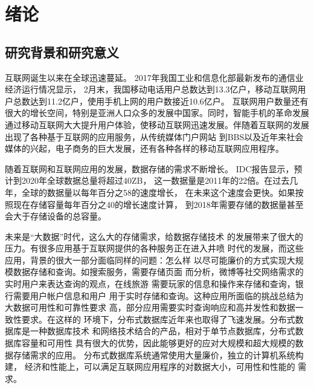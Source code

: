
\chapter{绪论}
\section{研究背景和研究意义}
互联网诞生以来在全球迅速蔓延。
2017年我国工业和信息化部最新发布的通信业经济运行情况显示，
2月末，我国移动电话用户总数达到13.3亿户，移动互联网用户总数达到11.2亿户，使用手机上网的用户数接近10.6亿户。
互联网用户数量还有很大的增长空间，特别是亚洲人口众多的发展中国家。同时，智能手机的革命发展
通过移动互联网大大提升用户体验，使移动互联网迅速发展。伴随着互联网的发展
出现了各种基于互联网的应用服务，从传统媒体门户网站
到BBS以及近年来社会媒体的兴起，电子商务的巨大发展，还有各种各样的移动互联网应用程序。

随着互联网和互联网应用的发展，数据存储的需求不断增长。
IDC报告显示，预计到2020年全球数据总量将超过40ZB，
这一数据量是2011年的22倍。在过去几年，全球的数据量以每年百分之58的速度增长，
在未来这个速度会更快。如果按照现在存储容量每年百分之40的增长速度计算，
到2018年需要存储的数据量甚至会大于存储设备的总容量。

未来是“大数据”时代，这么大的存储需求，给数据存储技术
的发展带来了很大的压力。有很多应用基于互联网提供的各种服务正在进入井喷
时代的发展，而这些应用，背景的很大一部分面临同样的问题：怎么样
以尽可能廉价的方式实现大规模数据存储和查询。如搜索服务，需要存储页面
而分析，微博等社交网络需求的实时用户来表达查询的观点，在线旅游
需要玩家的信息和操作来存储和查询，银行需要用户帐户信息和用户
用于实时存储和查询。这种应用所面临的挑战总结为大数据可用性和可靠性要求
高，部分应用需要实时查询响应和高并发性和数据一致性要求。在这样的
环境下，分布式数据库近年来也取得了飞速发展。分布式数据库是一种数据库技术
和网络技术结合的产品，相对于单节点数据库，分布式数据库容量和可用性
具有很大的优势，因此能够更好的应对大规模和超大规模的数据存储需求的应用。
分布式数据库系统通常使用大量廉价，独立的计算机系统构建，
经济和性能上，可以满足互联网应用程序的对数据大小，可用性和性能的
需求。
